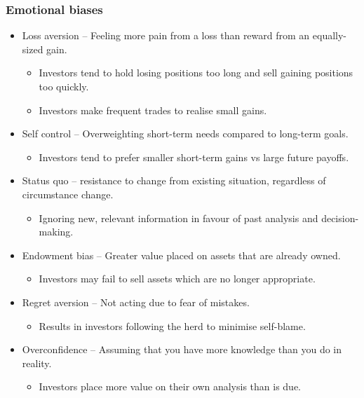 \documentclass[../notes_compiled.tex]{subfiles}
\begin{document}
\subsubsection{Emotional biases}
\begin{itemize}
\item Loss aversion -- Feeling more pain from a loss than reward from an equally-sized gain.
\begin{itemize}
\item Investors tend to hold losing positions too long and sell gaining positions too quickly.
\item Investors make frequent trades to realise small gains.
\end{itemize}
\item Self control -- Overweighting short-term needs compared to long-term goals.
\begin{itemize}
\item Investors tend to prefer smaller short-term gains vs large future payoffs.
\end{itemize}
\item Status quo -- resistance to change from existing situation, regardless of circumstance change.
\begin{itemize}
\item Ignoring new, relevant information in favour of past analysis and decision-making.
\end{itemize}
\item Endowment bias -- Greater value placed on assets that are already owned.
\begin{itemize}
\item Investors may fail to sell assets which are no longer appropriate.
\end{itemize}
\item Regret aversion -- Not acting due to fear of mistakes.
\begin{itemize}
\item Results in investors following the herd to minimise self-blame.
\end{itemize}
\item Overconfidence -- Assuming that you have more knowledge than you do in reality.
\begin{itemize}
\item Investors place more value on their own analysis than is due.
\end{itemize}
\end{itemize}
\end{document}

